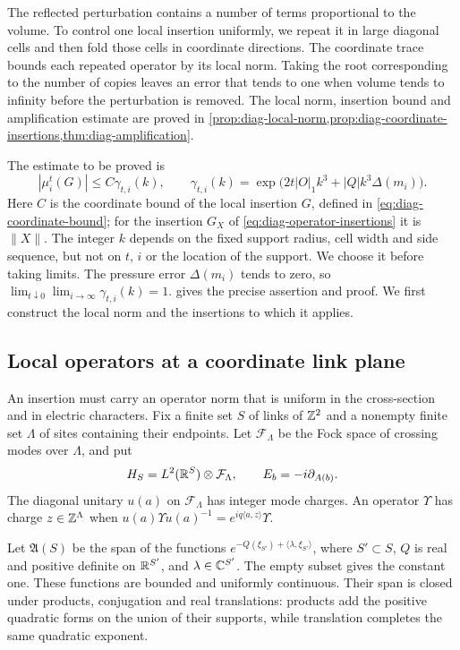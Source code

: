The reflected perturbation contains a number of terms proportional to
the volume. To control one local insertion uniformly, we repeat it
in large diagonal cells and then fold those cells in coordinate
directions. The coordinate trace bounds each repeated operator by
its local norm. Taking the root corresponding to the number of
copies leaves an error that tends to one when volume tends to
infinity before the perturbation is removed. The local norm,
insertion bound and amplification estimate are proved in
\cref{prop:diag-local-norm,prop:diag-coordinate-insertions,thm:diag-amplification}.

The estimate to be proved is
\[
 |\mu_i^t(G)|\le C\gamma_{t,i}(k),\qquad
 \gamma_{t,i}(k)=
 \exp\bigl(2t|O|_1k^3+|Q|k^3\Delta(m_i)\bigr).
\]
Here $C$ is the coordinate bound of the local insertion $G$, defined
in \eqref{eq:diag-coordinate-bound}; for the insertion $G_X$ of
\eqref{eq:diag-operator-insertions} it is $\|X\|$.
The integer $k$ depends on the fixed support
radius, cell width and side sequence, but not on $t$, $i$ or the
location of the support. We choose it before taking limits. The
pressure error $\Delta(m_i)$ tends to zero, so
$\lim_{t\downarrow0}\lim_{i\to\infty}\gamma_{t,i}(k)=1$.
 gives the precise assertion and proof.
We first construct the local norm and the insertions to which it applies.

\subsection{Local operators at a coordinate link plane}\label{subsec:diag-local-operators}

An insertion must carry an operator norm that is uniform in the
cross-section and in electric characters. Fix a finite set $S$ of
links of $\mathbb Z^2$ and a nonempty finite set $\Lambda$ of sites
containing their endpoints. Let $\mathcal F_\Lambda$ be the Fock
space of crossing modes over $\Lambda$, and put
\[
 H_S=L^2(\mathbb R^S)\otimes\mathcal F_\Lambda,
 \qquad E_b=-i\partial_{A(b)}.
\]
The diagonal unitary $u(a)$ on $\mathcal F_\Lambda$ has integer mode
charges. An operator $\Upsilon$ has charge $z\in\mathbb Z^\Lambda$ when
$u(a)\Upsilon u(a)^{-1}=e^{iq\langle a,z\rangle}\Upsilon$.

Let $\mathfrak A(S)$ be the span of the functions
$e^{-Q(\xi_{S'})+\langle\lambda,\xi_{S'}\rangle}$, where
$S'\subset S$, $Q$ is real and positive definite on $\mathbb R^{S'}$,
and $\lambda\in\mathbb C^{S'}$. The empty subset gives the constant one.
These functions are bounded and uniformly continuous. Their span
is closed under products, conjugation and real translations: products
add the positive quadratic forms on the union of their supports,
while translation completes the same quadratic exponent.

